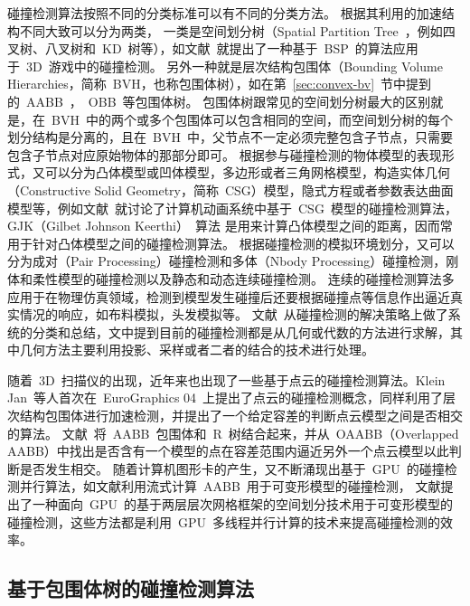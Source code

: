 碰撞检测算法按照不同的分类标准可以有不同的分类方法。
根据其利用的加速结构不同大致可以分为两类，
一类是空间划分树（Spatial Partition Tree~，例如四叉树、八叉树和~KD~树等），如文献~就提出了一种基于~BSP~的算法应用于~3D~游戏中的碰撞检测。
另外一种就是层次结构包围体（Bounding Volume Hierarchies，简称~BVH，也称包围体树），如在第~\ref{sec:convex-bv}~节中提到的~AABB~，~OBB~等包围体树。
包围体树跟常见的空间划分树最大的区别就是，在~BVH~中的两个或多个包围体可以包含相同的空间，而空间划分树的每个划分结构是分离的，且在~BVH~中，父节点不一定必须完整包含子节点，只需要包含子节点对应原始物体的那部分即可\cite{ericson2005real}。 
根据参与碰撞检测的物体模型的表现形式，又可以分为凸体模型或凹体模型，多边形或者三角网格模型，构造实体几何（Constructive
Solid Geometry，简称~CSG）模型，隐式方程或者参数表达曲面模型等，例如文献~就讨论了计算机动画系统中基于~CSG~模型的碰撞检测算法，GJK（Gilbet Johnson Keerthi）~算法\cite{gilbert1988fast,bergen1999fast}
是用来计算凸体模型之间的距离，因而常用于针对凸体模型之间的碰撞检测算法。
根据碰撞检测的模拟环境划分，又可以分为成对（Pair Processing）碰撞检测和多体（Nbody Processing）碰撞检测，刚体和柔性模型的碰撞检测以及静态和动态连续碰撞检测\cite{lin1998collision}。
连续的碰撞检测算法多应用于在物理仿真领域，检测到模型发生碰撞后还要根据碰撞点等信息作出逼近真实情况的响应，如布料模拟\cite{Brochu2012,Wang2014}，头发模拟\cite{Kaufman2014,Chai2014}等。
文献~从碰撞检测的解决策略上做了系统的分类和总结，文中提到目前的碰撞检测都是从几何或代数的方法进行求解，其中几何方法主要利用投影、采样或者二者的结合的技术进行处理。

随着~3D~扫描仪的出现，近年来也出现了一些基于点云的碰撞检测算法。Klein Jan~等人\cite{klein2004point}首次在~EuroGraphics 04~上提出了点云的碰撞检测概念，同样利用了层次结构包围体进行加速检测，并提出了一个给定容差的判断点云模型之间是否相交的算法。
文献~将~AABB~包围体和~R~树结合起来，并从~OAABB（Overlapped AABB）中找出是否含有一个模型的点在容差范围内逼近另外一个点云模型以此判断是否发生相交。
随着计算机图形卡的产生，又不断涌现出基于~GPU~的碰撞检测并行算法，如文献利用流式计算~AABB~用于可变形模型的碰撞检测，
文献提出了一种面向~GPU~的基于两层层次网格框架的空间划分技术用于可变形模型的碰撞检测，这些方法都是利用~GPU~多线程并行计算的技术来提高碰撞检测的效率。

\subsection{基于包围体树的碰撞检测算法}
\label{sec:cd-bvh}

